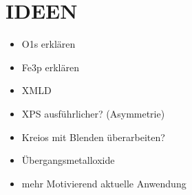             \section{IDEEN}
            \begin{itemize}
                \item O1s erklären
                \item Fe3p erklären 
                \item XMLD
                \item XPS ausführlicher? (Asymmetrie)
                \item Kreios mit Blenden überarbeiten?
                \item Übergangsmetalloxide
                \item mehr Motivierend aktuelle Anwendung
            \end{itemize}
            